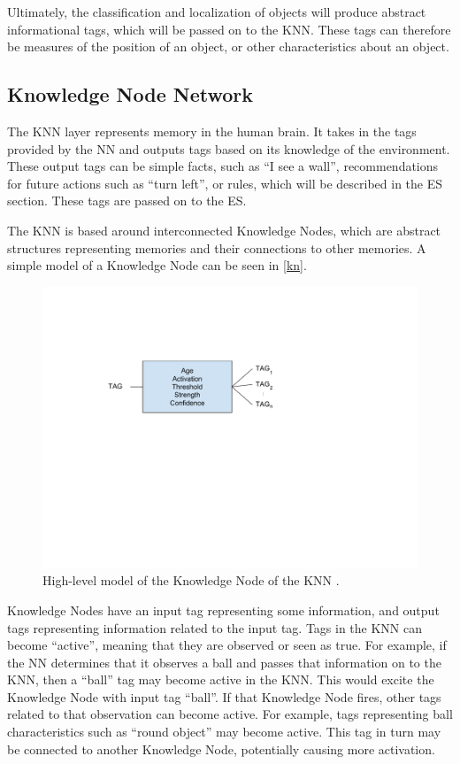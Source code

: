 \documentclass[titlepage,11pt]{article}
\newcommand{\ar}[1]{\autoref{#1}}
\begin{document}
Ultimately, the classification and localization of objects will produce abstract informational tags, which will be passed on to the KNN. These tags can therefore be measures of the position of an object, or other characteristics about an object.

\subsection{Knowledge Node Network}

The KNN layer represents memory in the human brain. It takes in the tags provided by the NN and outputs tags based on its knowledge of the environment. These output tags can be simple facts, such as ``I see a wall'', recommendations for future actions such as ``turn left'', or rules, which will be described in the ES section. These tags are passed on to the ES.

The KNN is based around interconnected Knowledge Nodes, which are abstract structures representing memories and their connections to other memories. A simple model of a Knowledge Node can be seen in \ar{kn}.

\begin{figure}[!htb]
	\includegraphics[width=\columnwidth]{figures/kn.pdf}
	\caption[High-level model of the Knowledge Node of the KNN.]
	{High-level model of the Knowledge Node of the KNN \cite{vybihal-knowledge}.}
	\label{kn}
\end{figure}

Knowledge Nodes have an input tag representing some information, and output tags representing information related to the input tag. Tags in the KNN can become ``active'', meaning that they are observed or seen as true. For example, if the NN determines that it observes a ball and passes that information on to the KNN, then a ``ball'' tag may become active in the KNN. This would excite the Knowledge Node with input tag ``ball''. If that Knowledge Node fires, other tags related to that observation can become active. For example, tags representing ball characteristics such as ``round object'' may become active. This tag in turn may be connected to another Knowledge Node, potentially causing more activation.
\end{document}

